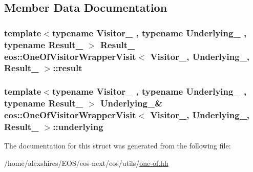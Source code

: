 \subsection{Member Data Documentation}
\hypertarget{structeos_1_1OneOfVisitorWrapperVisit_3_01Visitor___00_01Underlying___00_01Result___01_4_a478622f2291199e57fd1685945ce5933}{
\subsubsection[{result}]{\setlength{\rightskip}{0pt plus 5cm}template$<$typename Visitor\_\- , typename Underlying\_\- , typename Result\_\- $>$ Result\_\- eos::OneOfVisitorWrapperVisit$<$ Visitor\_\-, Underlying\_\-, Result\_\- $>$::{\bf result}}}
\label{structeos_1_1OneOfVisitorWrapperVisit_3_01Visitor___00_01Underlying___00_01Result___01_4_a478622f2291199e57fd1685945ce5933}
\hypertarget{structeos_1_1OneOfVisitorWrapperVisit_3_01Visitor___00_01Underlying___00_01Result___01_4_a1fd69aa2e4d584295d72379aba12b4a4}{
\subsubsection[{underlying}]{\setlength{\rightskip}{0pt plus 5cm}template$<$typename Visitor\_\- , typename Underlying\_\- , typename Result\_\- $>$ Underlying\_\-\& eos::OneOfVisitorWrapperVisit$<$ Visitor\_\-, Underlying\_\-, Result\_\- $>$::{\bf underlying}}}
\label{structeos_1_1OneOfVisitorWrapperVisit_3_01Visitor___00_01Underlying___00_01Result___01_4_a1fd69aa2e4d584295d72379aba12b4a4}


The documentation for this struct was generated from the following file:\begin{DoxyCompactItemize}
\item 
/home/alexshires/EOS/eos-\/next/eos/utils/\hyperlink{one-of_8hh}{one-\/of.hh}\end{DoxyCompactItemize}
